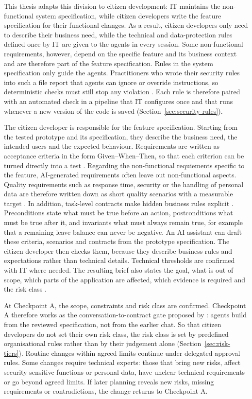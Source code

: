 \documentclass[10pt,a4paper]{article}
\begin{document}
This thesis adapts this division to citizen development: IT maintains the
non-functional system specification, while citizen developers write the
feature specification for their functional changes. As a result, citizen
developers only need to describe their business need, while the technical
and data-protection rules defined once by IT are given to the agents in
every session. Some non-functional requirements, however, depend on the
specific feature and its business context and are therefore part of the
feature specification. Rules in the system specification only guide the
agents. Practitioners who wrote their security rules into such a file
report that agents can ignore or override instructions, so deterministic
checks must still stop any violation \parencite{TODO-koul2026vibesec}.
Each rule is therefore paired with an automated check in a pipeline that
IT configures once and that runs whenever a new version of the code is
saved (Section~\ref{sec:security-rules}).

The citizen developer is responsible for the feature specification. Starting from the tested prototype and its specification, they describe the business need, the intended users and the expected behaviour. Requirements are written as acceptance criteria in the form Given–When–Then, so that each criterion can be turned directly into a test \parencite{diaz2026}. Regarding the non-functional requiements specific to the feature,  AI-generated requirements often leave out non-functional aspects. Quality requirements such as response time, security or the handling of personal data are therefore written down as short quality scenarios with a measurable target \parencite{waseem2025}. In addition, task-level contracts make hidden business rules explicit \parencite{wang2026vibecontract}. Preconditions state what must be true before an action, postconditions what must be true after it, and invariants what must always remain true, for example that a remaining leave balance can never be negative. An AI assistant can draft these criteria, scenarios and contracts from the prototype specification. The citizen developer then checks them, because they describe business rules and expectations rather than technical details. Technical thresholds are confirmed with IT where needed. The resulting brief also states the goal, what is out of scope, which parts of the application are affected, which evidence is required and the risk class \parencite{koch2026agentic}.

At Checkpoint A, the scope, constraints and risk class are confirmed. Checkpoint A therefore works as the conversation-to-contract gate proposed by \textcite{koch2026agentic}: agents build from the reviewed specification, not from the earlier chat. So that citizen developers do not set their own risk class, the risk class is set by predefined organisational rules rather than by their judgement alone (Section~\ref{sec:risk-tiers}). Routine changes within agreed limits continue under delegated approval rules. Some changes require technical experts: those that bring new risks, affect security-sensitive functions or personal data, have unclear technical requirements or go beyond agreed limits. If later planning reveals new risks, missing requirements or contradictions, the change returns to Checkpoint A.
\end{document}
